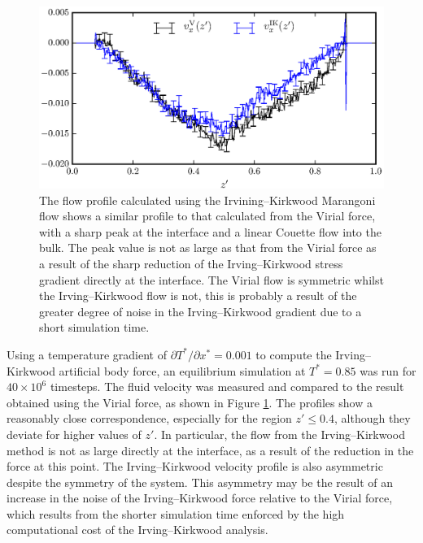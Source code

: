 \begin{figure}[h]
\centering
\includegraphics[scale=0.8]{PisIKFlow}
\caption{The flow profile calculated using the Irvining--Kirkwood Marangoni flow shows a similar profile to that calculated from the Virial force, with a sharp peak at the interface and a linear Couette flow into the bulk.
The peak value is not as large as that from the Virial force as a result of the sharp reduction of the Irving--Kirkwood stress gradient directly at the interface.
The Virial flow is symmetric whilst the Irving--Kirkwood flow is not, this is probably a result of the greater degree of noise in the Irving--Kirkwood gradient due to a short simulation time.}
\label{PisIKFlow}
\end{figure}
Using a temperature gradient of $\partial T^{*} / \partial x^{*} = 0.001$ to compute the Irving--Kirkwood artificial body force, an equilibrium simulation at $T^{*} = 0.85$ was run for $40 \times 10^{6}$ timesteps.
The fluid velocity was measured and compared to the result obtained using the Virial force, as shown in Figure \ref{PisIKFlow}.
The profiles show a reasonably close correspondence, especially for the region $z' \leq 0.4$, although they deviate for higher values of $z'$.
In particular, the flow from the Irving--Kirkwood method is not as large directly at the interface, as a result of the reduction in the force at this point.
The Irving--Kirkwood velocity profile is also asymmetric despite the symmetry of the system.
This asymmetry may be the result of an increase in the noise of the Irving--Kirkwood force relative to the Virial force, which results from the shorter simulation time enforced by the high computational cost of the Irving--Kirkwood analysis.

\FloatBarrier
